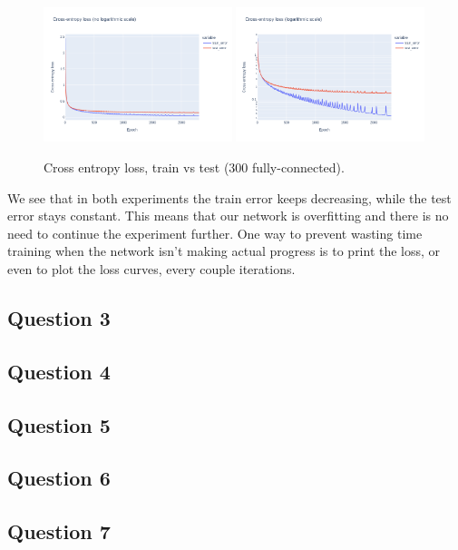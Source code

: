 \documentclass[12pt]{article}
\begin{document}
\begin{figure}[ht]
    \centering
    \includegraphics[width=0.49\textwidth]{images/cross-entropy-comparison-1-300.png}
    \includegraphics[width=0.49\textwidth]{images/cross-entropy-comparison-1-300-log.png}
    \caption{Cross entropy loss, train vs test ($300$ fully-connected).}
    \label{fig: loss comparison 1-300}
\end{figure}

We see that in both experiments the train error keeps decreasing, while the test error stays constant.
This means that our network is overfitting and there is no need to continue the experiment further.
One way to prevent wasting time training when the network isn't making actual progress is to print the loss, or even to plot the loss curves, every couple iterations.

\subsection{Question 3}

\subsection{Question 4}

\subsection{Question 5}

\subsection{Question 6}

\subsection{Question 7}
\end{document}
